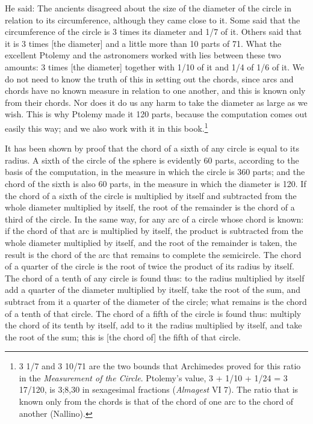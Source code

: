 \documentclass[11pt]{article}
\newcommand{\ArPage}[1]{\marginpar{\footnotesize\color{gray}Ar.\,p.\,#1}}
\begin{document}
\par He said: The ancients disagreed about the size of the diameter of the circle in relation to its circumference, although they came close to it. Some said that the circumference of the circle is 3 times its diameter and 1/7 of it. Others said that it is 3 times [the diameter] and a little more than 10 parts of 71. What the excellent Ptolemy and the astronomers worked with lies between these two amounts: 3 times [the diameter] together with 1/10 of it and 1/4 of 1/6 of it. We do not need to know the truth of this in setting out the chords, since arcs and chords have no known measure in relation to one another, and this is known only from their chords. Nor does it do us any harm to take the diameter as large as we wish. This is why Ptolemy made it 120 parts, because the computation comes out easily this way; and we also work with it in this book.\footnote{3 1/7 and 3 10/71 are the two bounds that Archimedes proved for this ratio in the \emph{Measurement of the Circle}. Ptolemy's value, 3 + 1/10 + 1/24 = 3 17/120, is 3;8,30 in sexagesimal fractions (\emph{Almagest} VI 7). The ratio that is known only from the chords is that of the chord of one arc to the chord of another (Nallino).}\par
\par \ArPage{14}It has been shown by proof that the chord of a sixth of any circle is equal to its radius. A sixth of the circle of the sphere is evidently 60 parts, according to the basis of the computation, in the measure in which the circle is 360 parts; and the chord of the sixth is also 60 parts, in the measure in which the diameter is 120. If the chord of a sixth of the circle is multiplied by itself and subtracted from the whole diameter multiplied by itself, the root of the remainder is the chord of a third of the circle. In the same way, for any arc of a circle whose chord is known: if the chord of that arc is multiplied by itself, the product is subtracted from the whole diameter multiplied by itself, and the root of the remainder is taken, the result is the chord of the arc that remains to complete the semicircle. The chord of a quarter of the circle is the root of twice the product of its radius by itself. The chord of a tenth of any circle is found thus: to the radius multiplied by itself add a quarter of the diameter multiplied by itself, take the root of the sum, and subtract from it a quarter of the diameter of the circle; what remains is the chord of a tenth of that circle. The chord of a fifth of the circle is found thus: multiply the chord of its tenth by itself, add to it the radius multiplied by itself, and take the root of the sum; this is [the chord of] the fifth of that circle.\par
\end{document}
